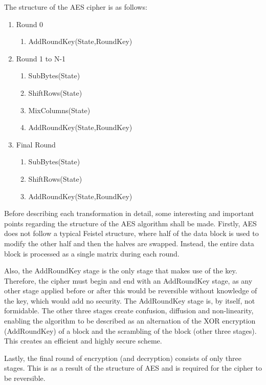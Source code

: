 \documentclass[a4paper,10pt]{report}
\begin{document}
The structure of the AES cipher is as follows:

\begin{enumerate}
 \item Round 0 
 \begin{enumerate}
  \item AddRoundKey(State,RoundKey) 
 \end{enumerate}
 \item Round 1 to N-1
 \begin{enumerate}
  \item SubBytes(State) 
  \item ShiftRows(State) 
  \item MixColumns(State)
  \item AddRoundKey(State,RoundKey) 
 \end{enumerate}
 \item Final Round
 \begin{enumerate}
  \item SubBytes(State) 
  \item ShiftRows(State)
  \item AddRoundKey(State,RoundKey) 
 \end{enumerate}
\end{enumerate}

Before describing each transformation in detail, some interesting and important points regarding the structure of the AES algorithm shall be made. Firstly, AES does not follow a typical Feistel structure, where half of the data block is used to modify the other half and then the halves are swapped. Instead, the entire data block is processed as a single matrix during each round. 

Also, the AddRoundKey stage is the only stage that makes use of the key. Therefore, the cipher must begin and end with an AddRoundKey stage, as any other stage applied before or after this would be reversible without knowledge of the key, which would add no security. The AddRoundKey stage is, by itself, not formidable. The other three stages create confusion, diffusion and non-linearity, enabling the algorithm to be described as an alternation of the XOR encryption (AddRoundKey) of a block and the scrambling of the block (other three stages). This creates an efficient and highly secure scheme. 

Lastly, the final round of encryption (and decryption) consists of only three stages. This is as a result of the structure of AES and is required for the cipher to be reversible. 
\end{document}
